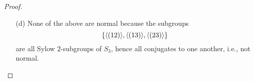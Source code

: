 \begin{proof}
\begin{enumerate}
        \item[(d)] None of the above are normal because the subgroups 
        \begin{equation*}
            \{\langle(12)\rangle, \langle(13)\rangle, \langle(23)\rangle\}
        \end{equation*}
        are all Sylow $2$-subgroups of $S_3$, hence all conjugates to one another, i.e., not normal. 
    \end{enumerate}
\end{proof}


